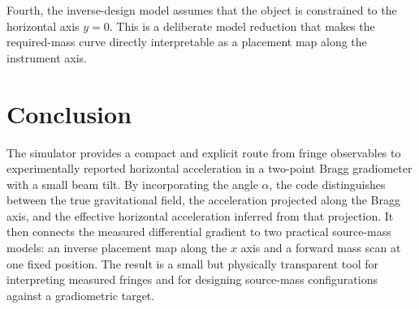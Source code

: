 \documentclass[11pt]{article}
\begin{document}
Fourth, the inverse-design model assumes that the object is constrained to the horizontal axis $y=0$. This is a deliberate model reduction that makes the required-mass curve directly interpretable as a placement map along the instrument axis.

\section{Conclusion}

The simulator provides a compact and explicit route from fringe observables to experimentally reported horizontal acceleration in a two-point Bragg gradiometer with a small beam tilt. By incorporating the angle $\alpha$, the code distinguishes between the true gravitational field, the acceleration projected along the Bragg axis, and the effective horizontal acceleration inferred from that projection. It then connects the measured differential gradient to two practical source-mass models: an inverse placement map along the $x$ axis and a forward mass scan at one fixed position. The result is a small but physically transparent tool for interpreting measured fringes and for designing source-mass configurations against a gradiometric target.
\end{document}
